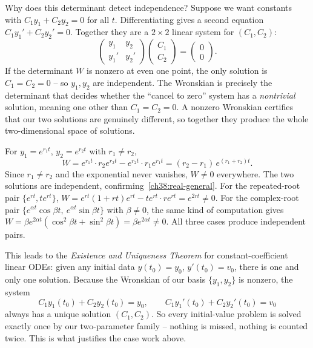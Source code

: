 \begin{whybox}
Why does this determinant detect independence? Suppose we want constants with
$C_1 y_1 + C_2 y_2 = 0$ for all $t$. Differentiating gives a second equation
$C_1 y_1' + C_2 y_2' = 0$. Together they are a $2\times 2$ linear system for
$(C_1, C_2)$:
\[
  \begin{pmatrix} y_1 & y_2 \\ y_1' & y_2' \end{pmatrix}
  \begin{pmatrix} C_1 \\ C_2 \end{pmatrix} = \begin{pmatrix} 0 \\ 0 \end{pmatrix}.
\]
If the determinant $W$ is nonzero at even one point, the only solution is $C_1 =
C_2 = 0$ -- so $y_1, y_2$ are independent. The Wronskian is precisely the
determinant that decides whether the ``cancel to zero'' system has a
\emph{nontrivial} solution, meaning one other than $C_1 = C_2 = 0$. A nonzero
Wronskian certifies that our two solutions are genuinely different, so together
they produce the whole two-dimensional space of solutions.
\end{whybox}

\begin{example}
\label{ch38:ex-wronskian}
For $y_1 = e^{r_1 t}$, $y_2 = e^{r_2 t}$ with $r_1 \neq r_2$,
\[
  W = e^{r_1 t}\cdot r_2 e^{r_2 t} - e^{r_2 t}\cdot r_1 e^{r_1 t}
    = (r_2 - r_1)\,e^{(r_1 + r_2)t}.
\]
Since $r_1 \neq r_2$ and the exponential never vanishes, $W \neq 0$ everywhere.
The two solutions are independent, confirming~\eqref{ch38:real-general}. For the
repeated-root pair $\{e^{rt}, t e^{rt}\}$,
$W = e^{rt}(1+rt)e^{rt} - te^{rt}\cdot re^{rt} = e^{2rt} \neq 0$. For the
complex-root pair $\{e^{\alpha t}\cos\beta t,\ e^{\alpha t}\sin\beta t\}$ with
$\beta\neq 0$, the same kind of computation gives
$W = \beta e^{2\alpha t}(\cos^2\beta t+\sin^2\beta t) = \beta e^{2\alpha t} \neq 0$.
All three cases produce independent pairs.
\end{example}

\begin{formalbox}
This leads to the \emph{Existence and Uniqueness Theorem} for constant-coefficient
linear ODEs: given any initial data $y(t_0) = y_0$, $y'(t_0) = v_0$, there is one
and only one solution. Because the Wronskian of our basis $\{y_1, y_2\}$ is
nonzero, the system
\[
  C_1 y_1(t_0) + C_2 y_2(t_0) = y_0, \qquad
  C_1 y_1'(t_0) + C_2 y_2'(t_0) = v_0
\]
always has a unique solution $(C_1, C_2)$. So every initial-value problem is
solved exactly once by our two-parameter family -- nothing is missed, nothing is
counted twice. This is what justifies the case work above.
\end{formalbox}


